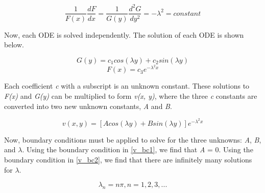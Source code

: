 \documentclass[10pt]{article}
\begin{document}


\vspace{-5pt}
\begin{equation}
\frac{1}{F(x)} \frac{dF}{dx} = \frac{1}{G(y)} \frac{d^2G}{dy^2} = -\lambda ^2 = constant
\label{intro_lambda}
\end{equation}

Now, each ODE is solved independently. The solution of each ODE is shown below.

\vspace{-5pt}
\begin{equation}
G(y) = c_1 cos(\lambda y) + c_2 sin(\lambda y)
\label{G_soln}
\end{equation}
\vspace{-11pt}
\begin{equation}
F(x) = c_3 e^{-\lambda^2 x}
\label{F_soln}
\end{equation}

Each coefficient \textit{c} with a subscript is an unknown constant. These solutions to \textit{F(x)} and \textit{G(y)} can be multiplied to form \textit{v(x, y)}, where the three \textit{c} constants are converted into two new unknown constants, \textit{A} and \textit{B}.

\vspace{-5pt}
\begin{equation}
v(x, y) = [A cos(\lambda y) + B sin(\lambda y)] e^{-\lambda^2 x}
\label{v_soln_A_B}
\end{equation}

Now, boundary conditions must be applied to solve for the three unknowns: \textit{A}, \textit{B}, and \textit{$\lambda$}. Using the boundary condition in \eqref{v_bc1}, we find that \textit{A} = 0. Using the boundary condition in \eqref{v_bc2}, we find that there are infinitely many solutions for $\lambda$.


\vspace{-11pt}
\begin{equation}
\lambda_n = n\pi, n = 1, 2, 3, ...
\label{lambda_n}
\end{equation}
\end{document}
